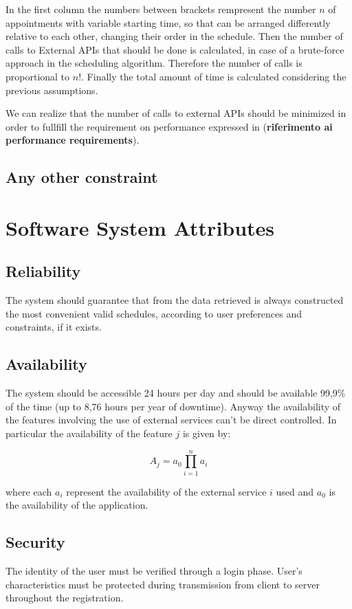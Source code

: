 In the first column the numbers between brackets rempresent the number $n$ of appointments with variable starting time, so that can be arranged differently relative to each other, changing their order in the schedule. Then the number of calls to External APIs that should be done is calculated, in case of a brute-force approach in the scheduling algorithm. Therefore the number of calls is proportional to $n!$.
Finally the total amount of time is calculated considering the previous assumptions.

We can realize that the number of calls to external APIs should be minimized in order to fullfill the requirement on performance expressed in (\textbf{riferimento ai performance requirements}).

\subsection{Any other constraint}


\section{Software System Attributes}

\subsection{Reliability}
The system should guarantee that from the data retrieved is always constructed the most convenient valid schedules, according to user preferences and constraints, if it exists.

\subsection{Availability}
The system should be accessible 24 hours per day and should be available 99,9\% of the time (up to 8,76 hours per year of downtime). Anyway the availability of the features involving the use of external services can't be direct controlled. In particular the availability of the feature $j$ is given by:

\begin{equation}
A_j = a_0 \prod_{i=1}^n a_i 
\end{equation} 

where each $a_i$ represent the availability of the external service $i$ used and $a_0$ is the availability of the application.

\subsection{Security}
The identity of the user must be verified through a login phase.
User's characteristics must be protected during transmission from client to server throughout the registration.

